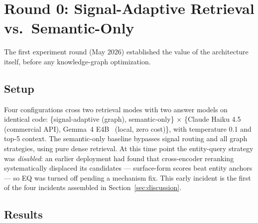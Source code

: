 
\section{Round 0: Signal-Adaptive Retrieval vs.\ Semantic-Only}
\label{sec:round0}

The first experiment round (May 2026) established the value of the
architecture itself, before any knowledge-graph optimization.

\subsection{Setup}

Four configurations cross two retrieval modes with two answer models on
identical code: \{signal-adaptive (graph), semantic-only\} $\times$
\{Claude Haiku 4.5~\cite{claudehaiku45} (commercial API), Gemma~4
E4B~\cite{gemma4} (local, zero cost)\}, with temperature 0.1 and top-5
context. The semantic-only baseline bypasses signal routing and all graph
strategies, using pure dense retrieval. At this time point the
entity-query strategy was \emph{disabled}: an earlier deployment had
found that cross-encoder reranking systematically displaced its
candidates --- surface-form scores beat entity anchors --- so EQ was
turned off pending a mechanism fix. This early incident is the first of
the four incidents assembled in Section~\ref{sec:discussion}.

\subsection{Results}

